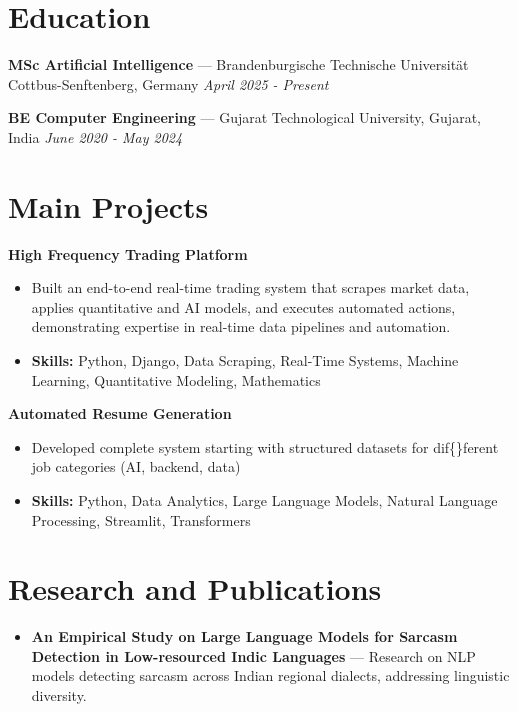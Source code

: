 \documentclass[a4paper,10pt]{article}
\begin{document}
\section*{Education}
\textbf{MSc Artificial Intelligence} — Brandenburgische Technische Universität Cottbus-Senftenberg, Germany \hfill \textit{April 2025 - Present}\par
\vspace{1.5pt}
\textbf{BE Computer Engineering} — Gujarat Technological University, Gujarat, India \hfill \textit{June 2020 - May 2024}\par

\section*{Main Projects}
\textbf{High Frequency Trading Platform}\par
\vspace{1pt}
\begin{itemize}
  \item Built an end-to-end real-time trading system that scrapes market data, applies quantitative and AI models, and executes automated actions, demonstrating expertise in real-time data pipelines and automation.
  \item \textbf{Skills:} Python, Django, Data Scraping, Real-Time Systems, Machine Learning, Quantitative Modeling, Mathematics
\end{itemize}
\vspace{3pt}
\textbf{Automated Resume Generation}\par
\vspace{1pt}
\begin{itemize}
  \item Developed complete system starting with structured datasets for dif\{\}ferent job categories (AI, backend, data)
  \item \textbf{Skills:} Python, Data Analytics, Large Language Models, Natural Language Processing, Streamlit, Transformers
\end{itemize}

\section*{Research and Publications}
\begin{itemize}
\item \textbf{An Empirical Study on Large Language Models for Sarcasm Detection in Low-resourced Indic Languages} — Research on NLP models detecting sarcasm across Indian regional dialects, addressing linguistic diversity.
\end{itemize}
\end{document}
